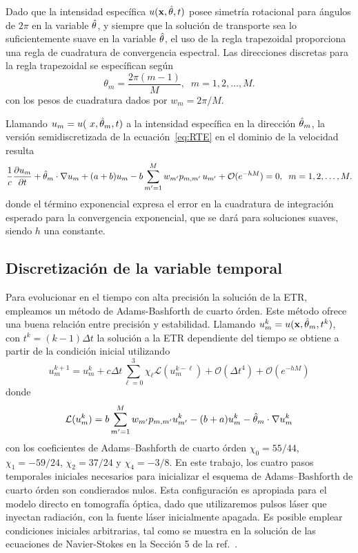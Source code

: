 Dado que la intensidad específica $u(\mathbf{x},\hat{\theta},t)$ posee simetría rotacional
para ángulos de $2\pi$ en la variable $\hat{\theta}$, y siempre que la solución de 
transporte sea lo suficientemente
suave en la variable $\hat{\theta}$, el uso de la regla trapezoidal 
proporciona una regla de cuadratura de convergencia espectral. 
Las direcciones discretas para la regla trapezoidal se específican 
según
\begin{equation}
\theta_m=\frac{2\pi(m-1)}{M}, \; \; m=1,2,\ldots,M.
\label{eq:RTETrapz}
\end{equation}
con los pesos de cuadratura dados por $w_{m}=2\pi/M$.

Llamando  $ u_m= u (\ x, \hat{\theta}_m, t)$ a la intensidad específica 
en la dirección $\hat{\theta}_m$, la versión semidiscretizada de la 
ecuación~\eqref{eq:RTE} en el dominio de la velocidad resulta
\begin{equation*}
\frac{1}{c}  \frac{\partial  u_m}{\partial t}  
 + \hat{\theta}_m
\cdot  \nabla u_m + (a+b) u_m
-b\sum_{m'=1}^M w_{m'}
p_{m,m'} \, u_{m'}+\mathcal{O}(e^{-hM}) =0, \; \; m=1,2,\ldots,M.
\label{eq:RTEdom}
\end{equation*}
donde el término exponencial expresa el error en la cuadratura 
de integración esperado para la convergencia exponencial, que se dará 
para soluciones suaves, siendo $h$ una constante.
\subsection{Discretización de la variable temporal}
\label{sec:adamsbashforth}
Para evolucionar en el tiempo con alta precisión la solución de la ETR,
empleamos un método de Adams-Bashforth de cuarto órden. Este método ofrece una 
buena relación entre precisión y estabilidad.
Llamando $u_m^k=u(\mathbf{x},\hat{\theta}_m,t^k)$, con $t^{k}=(k-1)\Delta t$ la solución 
a la ETR 
dependiente del tiempo se obtiene a partir de la condición inicial utilizando
\begin{equation}
u_m^{k+1} =  u_m^k + c\Delta t \sum_{\ell=0}^3 \chi_{\ell} \mathcal{L} ( u^{k-\ell}_m)  
+\mathcal{O}(\Delta t^4)+\mathcal{O}(e^{-hM})
\label{eq:RTEAB4}
\end{equation}
donde
\begin{equation}
\mathcal{L} ( u_m^k) = b\sum_{m'=1}^{M} w_{m'} p_{m,m'} u_{m'}^k-(b+a)u_m^k-\hat{\theta}_m \cdot \nabla u_m^k \notag
\label{eq:RTEAB4L}
\end{equation}
con los coeficientes de Adams--Bashforth de cuarto órden $\chi_0=55/44$, 
$\chi_1=-59/24$, $\chi_2=37/24$ y $\chi_4=-3/8$. 
En este trabajo, los cuatro pasos temporales iniciales necesarios para inicializar 
el esquema de Adams--Bashforth de cuarto órden son condierados nulos. Esta configuración es 
apropiada para 
el modelo directo en tomografía óptica, dado que utilizaremos pulsos láser 
que inyectan radiación, con la fuente láser inicialmente apagada. Es posible 
emplear condiciones iniciales arbitrarias, tal como se muestra en 
la solución de las ecuaciones de Navier-Stokes en la Sección 5 de la ref.~\cite{Bruno2016}.

